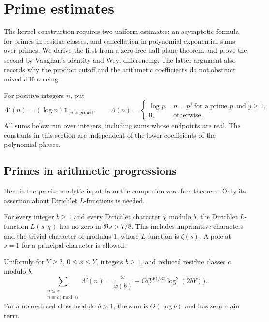 \section{Prime estimates}\label{sec:primes}

The kernel construction requires two uniform estimates: an asymptotic
formula for primes in residue classes, and cancellation in polynomial
exponential sums over primes.  We derive the first from a zero-free
half-plane theorem and prove the second by Vaughan's identity and Weyl
differencing.  The latter argument also records why the product cutoff
and the arithmetic coefficients do not obstruct mixed differencing.

For positive integers $n$, put
\[
 \Lambda'(n)=(\log n)\mathbf 1_{\{n\text{ is prime}\}},\qquad
 \Lambda(n)=
 \begin{cases}\log p,&n=p^j\text{ for a prime }p\text{ and }j\ge1,\\
 0,&\text{otherwise}.
 \end{cases}
\]
All sums below run over integers, including sums whose endpoints are
real.  The constants in this section are independent of the lower
coefficients of the polynomial phases.

\subsection{Primes in arithmetic progressions}

Here is the precise analytic input from the companion zero-free theorem.
Only its assertion about Dirichlet $L$-functions is needed.

\begin{theorem}
\label{thm:zero-free-input}
For every integer $b\ge1$ and every Dirichlet character $\chi$ modulo
$b$, the Dirichlet $L$-function $L(s,\chi)$ has no zero in
$\Re s>7/8$.  This includes imprimitive characters and the trivial
character of modulus $1$, whose $L$-function is $\zeta(s)$.  A pole at
$s=1$ for a principal character is allowed.
\end{theorem}

\begin{proposition}
\label{prop:prime-progressions}
Uniformly for $Y\ge2$, $0\le x\le Y$, integers $b\ge1$, and reduced
residue classes $c$ modulo $b$,
\begin{equation}\label{eq:prime-progression}
 \sum_{\substack{n\le x\\n\equiv c\pmod b}}\Lambda'(n)
 =\frac{x}{\varphi(b)}
   +O\bigl(Y^{31/32}\log^2(2bY)\bigr).
\end{equation}
For a nonreduced class modulo $b>1$, the sum is $O(\log b)$ and has
zero main term.
\end{proposition}


